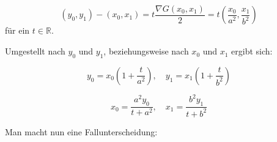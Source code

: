 \begin{equation}
	(y_0,y_1) - (x_0, x_1) = t\frac{\nabla G(x_0,x_1)}{2} = t\left(\frac{x_0}{a^2},\frac{x_1}{b^2}\right)
\end{equation}
für ein $t\in\mathbb{R}$.

Umgestellt nach $y_0$ und $y_1$, beziehungsweise nach $x_0$ und $x_1$ ergibt sich:

\begin{equation}\label{eq:ellipseDistY}
y_0 = x_0\left(1 + \frac{t}{a^2}\right), \quad y_1 = x_1\left(1 + \frac{t}{b^2}\right)
\end{equation}

\begin{equation}\label{eq:ellipseDistX}
x_0 = \frac{a^2y_0}{t+a^2},\quad x_1 = \frac{b^2y_1}{t+b^2}
\end{equation}



Man macht nun eine Fallunterscheidung:

